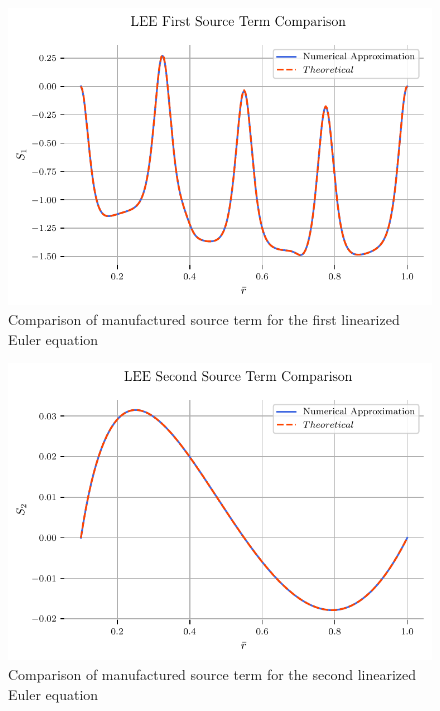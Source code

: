 \begin{figure}[h!]
    \centering
    \includegraphics{../../../CodeRun/04-plotReport/tex-outputs/MMS1_SourceTermComparison1.pdf}
    \caption{Comparison of manufactured source term for the first linearized Euler equation}
    \label{fig:6}
\end{figure}

\begin{figure}[h!]
    \centering
    \includegraphics{../../../CodeRun/04-plotReport/tex-outputs/MMS1_SourceTermComparison2.pdf}
    \caption{Comparison of manufactured source term for the second linearized Euler equation}
\end{figure}

